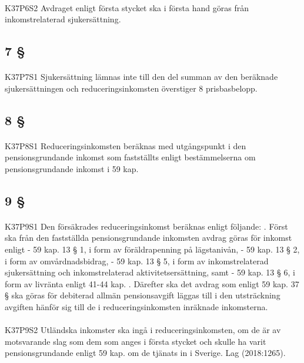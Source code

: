 \documentclass[a4paper,notitlepage,openany,10pt]{book}
\begin{document}
\paragraph*{}
{\tiny K37P6S2}
Avdraget enligt första stycket ska i första hand göras från inkomstrelaterad sjukersättning.
\subsection*{7 §}
\paragraph*{}
{\tiny K37P7S1}
Sjukersättning lämnas inte till den del summan av den beräknade sjukersättningen och reduceringsinkomsten överstiger 8 prisbasbelopp.
\subsection*{8 §}
\paragraph*{}
{\tiny K37P8S1}
Reduceringsinkomsten beräknas med utgångspunkt i den pensionsgrundande inkomst som fastställts enligt bestämmelserna om pensionsgrundande inkomst i 59 kap.
\subsection*{9 §}
\paragraph*{}
{\tiny K37P9S1}
Den försäkrades reduceringsinkomst beräknas enligt följande:
. Först ska från den fastställda pensionsgrundande inkomsten avdrag göras för inkomst enligt
\newline - 59 kap. 13 § 1, i form av föräldrapenning på lägstanivån,
\newline - 59 kap. 13 § 2, i form av omvårdnadsbidrag,
\newline - 59 kap. 13 § 5, i form av inkomstrelaterad sjukersättning och inkomstrelaterad aktivitetsersättning, samt
\newline - 59 kap. 13 § 6, i form av livränta enligt 41-44 kap.
. Därefter ska det avdrag som enligt 59 kap. 37 § ska göras för debiterad allmän pensionsavgift läggas till i den utsträckning avgiften hänför sig till de i reduceringsinkomsten inräknade inkomsterna.
\paragraph*{}
{\tiny K37P9S2}
Utländska inkomster ska ingå i reduceringsinkomsten, om de är av motsvarande slag som dem som anges i första stycket och skulle ha varit pensionsgrundande enligt 59 kap. om de tjänats in i Sverige.
Lag (2018:1265).
\end{document}
